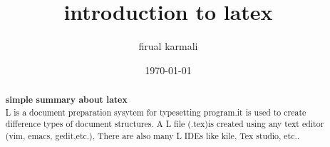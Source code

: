 \documentclass[a3 paper,12pt]{article}
\title{introduction to latex}
\author{firual karmali}
\date{\today}
\begin{document}
\begin{abstract}
    \textbf{simple summary about latex}\\
    L is a document preparation sysytem for typesetting program.it is used to create difference types of document structures. A L file (.tex)is created using any text editor (vim, emacs, gedit,etc.), There are also many L IDEs like kile, Tex studio, etc..
\end{abstract}
\end{document}
